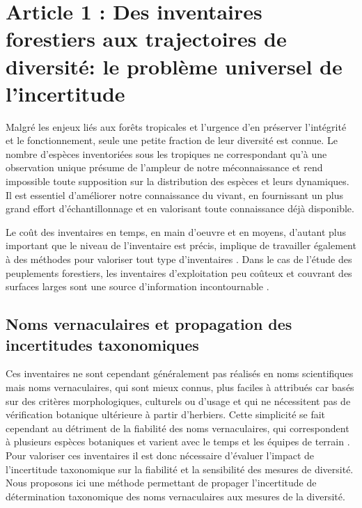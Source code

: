 \documentclass[
  11pt,
  french,
  A4paper,
  extrafontsizes,onecolumn,openright
  ]{memoir}
\begin{document}
\chapter{Article 1 : Des inventaires forestiers aux trajectoires de
diversité: le problème universel de
l'incertitude}\label{article-1-des-inventaires-forestiers-aux-trajectoires-de-diversite-le-probleme-universel-de-lincertitude}

Malgré les enjeux liés aux forêts tropicales et l'urgence d'en préserver
l'intégrité et le fonctionnement, seule une petite fraction de leur
diversité est connue. Le nombre d'espèces inventoriées sous les
tropiques ne correspondant qu'à une observation unique
\autocite{Feeley2011} présume de l'ampleur de notre méconnaissance et
rend impossible toute supposition sur la distribution des espèces et
leurs dynamiques. Il est essentiel d'améliorer notre connaissance du
vivant, en fournissant un plus grand effort d'échantillonnage et en
valorisant toute connaissance déjà disponible.

Le coût des inventaires en temps, en main d'oeuvre et en moyens,
d'autant plus important que le niveau de l'inventaire est précis,
implique de travailler également à des méthodes pour valoriser tout type
d'inventaires \autocite{Baraloto2012}. Dans le cas de l'étude des
peuplements forestiers, les inventaires d'exploitation peu coûteux et
couvrant des surfaces larges sont une source d'information
incontournable \autocites{terSteege2000}{Guitet2014}.

\section{Noms vernaculaires et propagation des incertitudes
taxonomiques}\label{noms-vernaculaires-et-propagation-des-incertitudes-taxonomiques}

Ces inventaires ne sont cependant généralement pas réalisés en noms
scientifiques mais noms vernaculaires, qui sont mieux connus, plus
faciles à attribués car basés sur des critères morphologiques, culturels
ou d'usage et qui ne nécessitent pas de vérification botanique
ultérieure à partir d'herbiers. Cette simplicité se fait cependant au
détriment de la fiabilité des noms vernaculaires, qui correspondent à
plusieurs espèces botaniques et varient avec le temps et les équipes de
terrain \autocite{Oldeman1968}. Pour valoriser ces inventaires il est
donc nécessaire d'évaluer l'impact de l'incertitude taxonomique sur la
fiabilité et la sensibilité des mesures de diversité. Nous proposons ici
une méthode permettant de propager l'incertitude de détermination
taxonomique des noms vernaculaires aux mesures de la diversité.
\end{document}
